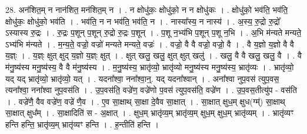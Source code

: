 \documentclass[17pt]{extarticle}
\begin{document}
28. अन॑शित॒म् न नान॑शित॒ मन॑शित॒म् न । . न क्षोधु॑कः॒ क्षोधु॑को॒ न न क्षोधु॑कः । . क्षोधु॑को॒ भव॑ति॒ भव॑ति॒ क्षोधु॑कः॒ क्षोधु॑को॒ भव॑ति । . भव॑ति॒ न न भव॑ति॒ भव॑ति॒ न । . नास्या᳚स्य॒ न नास्य॑ । . अ॒स्य॒ रु॒द्रो रु॒द्रो᳚ ऽस्यास्य रु॒द्रः । . रु॒द्रः प॒शून् प॒शून् रु॒द्रो रु॒द्रः प॒शून् । . प॒शू न॒भ्य॑भि प॒शून् प॒शू न॒भि । . अ॒भि म॑न्यते मन्यते॒ ऽभ्य॑भि म॑न्यते । . म॒न्य॒ते॒ वज्रो॒ वज्रो॑ मन्यते मन्यते॒ वज्रः॑ । . वज्रो॒ वै वै वज्रो॒ वज्रो॒ वै । . वै य॒ज्ञो य॒ज्ञो वै वै य॒ज्ञ्ः । . य॒ज्ञ्ः क्षुत् क्षुद् य॒ज्ञो य॒ज्ञ्ः क्षुत् । . क्षुत् खलु॒ खलु॒ क्षुत् क्षुत् खलु॑ । . खलु॒ वै वै खलु॒ खलु॒ वै । . वै म॑नु॒ष्य॑स्य मनु॒ष्य॑स्य॒ वै वै म॑नु॒ष्य॑स्य । . म॒नु॒ष्य॑स्य॒ भ्रातृ॑व्यो॒ भ्रातृ॑व्यो मनु॒ष्य॑स्य मनु॒ष्य॑स्य॒ भ्रातृ॑व्यः । . भ्रातृ॑व्यो॒ यद् यद् भ्रातृ॑व्यो॒ भ्रातृ॑व्यो॒ यत् । . यदना᳚श्वा॒ नना᳚श्वा॒न्॒. यद् यदना᳚श्वान् । . अना᳚श्वा नुप॒वस॑ त्युप॒वस॒ त्यना᳚श्वा॒ नना᳚श्वा नुप॒वस॑ति । . उ॒प॒वस॑ति॒ वज्रे॑ण॒ वज्रे॑णो प॒वस॑ त्युप॒वस॑ति॒ वज्रे॑ण । . उ॒प॒वस॒तीत्यु॑प - वस॑ति । . वज्रे॑णै॒ वैव वज्रे॑ण॒ वज्रे॑ णै॒व । . ए॒व सा॒क्षाथ् सा॒क्षा दे॒वैव सा॒क्षात् । . सा॒क्षात् क्षुध॒म् क्षुध(ग्म्॑) सा॒क्षाथ् सा॒क्षात् क्षुध᳚म् । . सा॒क्षादिति॑ स - अ॒क्षात् । . क्षुध॒म् भ्रातृ॑व्य॒म् भ्रातृ॑व्य॒म् क्षुध॒म् क्षुध॒म् भ्रातृ॑व्यम् । . भ्रातृ॑व्यꣳ हन्ति हन्ति॒ भ्रातृ॑व्य॒म् भ्रातृ॑व्यꣳ हन्ति । . ह॒न्तीति॑ हन्ति । \newline
\end{document}
